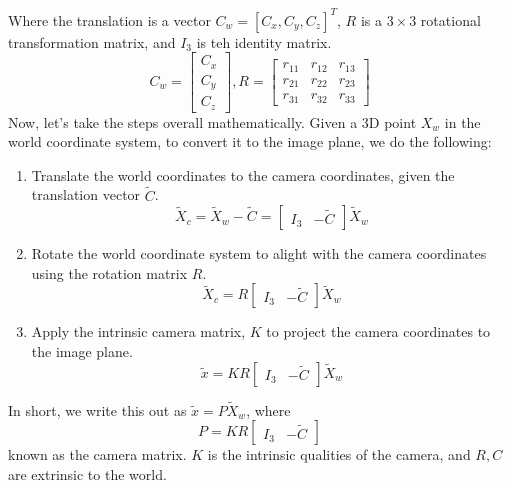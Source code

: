 \documentclass{article}
\begin{document}
Where the translation is a vector $C_w = [C_x,C_y,C_z]^T$, $R$ is a $3\times 3$ rotational transformation matrix, and $I_3$ is teh identity matrix.
$$C_w = \begin{bmatrix}
C_x\\C_y\\C_z
\end{bmatrix}, R = \begin{bmatrix}
r_{11} & r_{12} & r_{13}\\
r_{21} & r_{22} & r_{23}\\
r_{31} & r_{32} & r_{33}
\end{bmatrix}$$
Now, let's take the steps overall mathematically. Given a 3D point $X_w$ in the world coordinate system, to convert it to the image plane, we do the following:
\begin{enumerate}
    \item Translate the world coordinates to the camera coordinates, given the translation vector $\tilde{C}$.
    $$\tilde{X}_c = \tilde{X}_w - \tilde{C} = \begin{bmatrix}
    I_3 & -\tilde{C}
    \end{bmatrix}\tilde{X}_w$$
    \item Rotate the world coordinate system to alight with the camera coordinates using the rotation matrix $R$.
    $$\tilde{X}_c =  R \begin{bmatrix}
    I_3 & -\tilde{C}
    \end{bmatrix}\tilde{X}_w$$
    \item Apply the intrinsic camera matrix, $K$ to project the camera coordinates to the image plane. 
    $$\tilde{x} = K R \begin{bmatrix}
    I_3 & -\tilde{C}
    \end{bmatrix}\tilde{X}_w$$
\end{enumerate}
In short, we write this out as $\tilde{x} = P\tilde{X}_w$, where $$P = KR \begin{bmatrix}I_3 & -\tilde{C} \end{bmatrix}$$ known as the camera matrix. $K$ is the intrinsic qualities of the camera, and $R, C$ are extrinsic to the world.
\end{document}
